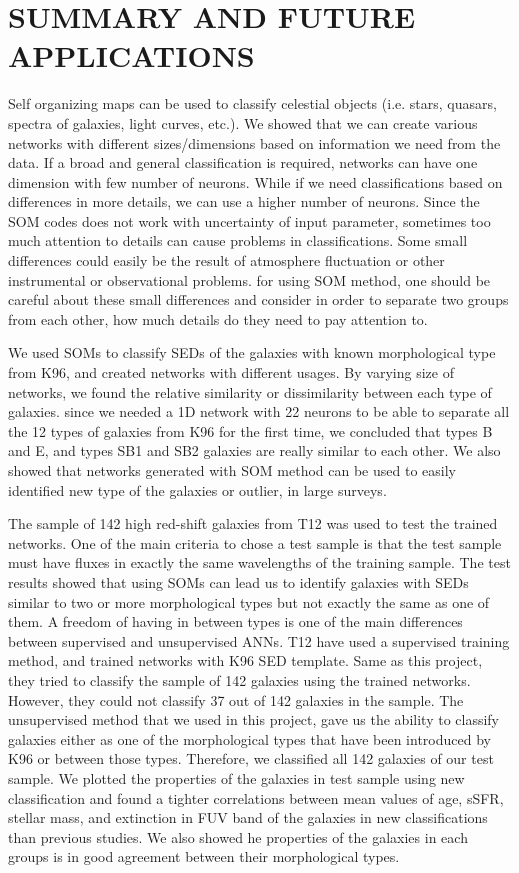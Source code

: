 \documentclass[useAMS,usenatbib]{mn2e}
\begin{document}
\section{SUMMARY AND FUTURE APPLICATIONS}
\label{sec: summary}

Self organizing maps can be used to classify celestial objects (i.e. stars, quasars, spectra of galaxies, light curves, etc.).
We showed that we can create various networks with different sizes/dimensions based on information we need from the data. 
If a broad and general classification is required, networks can have one dimension with few number of neurons.
While if we need classifications based on differences in more details, we can use a higher number of neurons.
Since the SOM codes does not work with uncertainty of input parameter, sometimes too much attention to details can cause problems in classifications. 
Some small differences could easily be the result of atmosphere fluctuation or other instrumental or observational problems. 
for using SOM method, one should be careful about these small differences and consider in order to separate two groups from each other, how much details do they need to pay attention to.

We used SOMs to classify SEDs of the galaxies with known morphological type from K96, and created networks with different usages.
By varying size of networks, we found the relative similarity or dissimilarity between each type of galaxies.
since we needed a 1D network with 22 neurons to be able to separate all the 12 types of galaxies from K96 for the first time, we concluded that types B and E, and types SB1 and SB2 galaxies are really similar to each other.
We also showed that networks generated with SOM method can be used to easily identified new type of the galaxies or outlier, in large surveys.

The sample of 142 high red-shift galaxies from T12 was used to test the trained networks.
One of the main criteria to chose a test sample is that the test sample must have fluxes in exactly the same wavelengths of the training sample.
The test results showed that using SOMs can lead us to identify galaxies with SEDs similar to two or more morphological types but not exactly the same as one of them.
A freedom of having in between types is one of the main differences between supervised and unsupervised ANNs.
T12  have used a supervised training method, and trained networks with K96 SED template.
Same as this project, they tried to classify the sample of 142 galaxies using the trained networks.
However, they could not classify 37 out of 142 galaxies in the sample.
The unsupervised method that we used in this project, gave us the ability to classify galaxies either as one of the morphological types that have been introduced by K96 or between those types. 
Therefore, we classified all 142 galaxies of our test sample.
We plotted the properties of the galaxies in test sample using new classification and found a tighter correlations between mean values of age, sSFR, stellar mass, and extinction in FUV band of the galaxies in new classifications than previous studies.
We also showed he properties of the galaxies in each groups is in good agreement between their morphological types.
\end{document}
